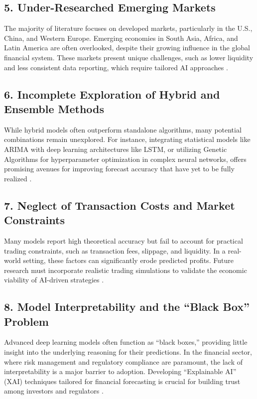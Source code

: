 \documentclass[11pt,a4paper]{article}
\begin{document}
\subsection*{5. Under-Researched Emerging Markets}
The majority of literature focuses on developed markets, particularly in the U.S., China, and Western
Europe. Emerging economies in South Asia, Africa, and Latin America are often overlooked, despite
their growing influence in the global financial system. These markets present unique challenges,
such as lower liquidity and less consistent data reporting, which require tailored AI approaches
\cite{strader2020,venkatarathnam2024}.

\subsection*{6. Incomplete Exploration of Hybrid and Ensemble Methods}
While hybrid models often outperform standalone algorithms, many potential combinations remain
unexplored. For instance, integrating statistical models like ARIMA with deep learning architectures
like LSTM, or utilizing Genetic Algorithms for hyperparameter optimization in complex neural
networks, offers promising avenues for improving forecast accuracy that have yet to be fully realized
\cite{rouf2021,sonkavde2023}.

\subsection*{7. Neglect of Transaction Costs and Market Constraints}
Many models report high theoretical accuracy but fail to account for practical trading constraints,
such as transaction fees, slippage, and liquidity. In a real-world setting, these factors can significantly
erode predicted profits. Future research must incorporate realistic trading simulations to validate the
economic viability of AI-driven strategies \cite{ferreira2021}.

\subsection*{8. Model Interpretability and the ``Black Box'' Problem}
Advanced deep learning models often function as ``black boxes,'' providing little insight into the
underlying reasoning for their predictions. In the financial sector, where risk management and
regulatory compliance are paramount, the lack of interpretability is a major barrier to adoption.
Developing ``Explainable AI'' (XAI) techniques tailored for financial forecasting is crucial for
building trust among investors and regulators \cite{ferreira2021,chopra2021}.
\end{document}
